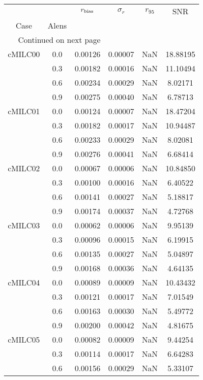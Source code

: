 \begin{longtable}{cccccc}
\toprule
        &     &  $r_{\rm bias}$  &  $\sigma_r$ &  $r_{95}$ &      SNR \\
Case & Alens &                  &             &           &          \\
\midrule
\endhead
\midrule
\multicolumn{3}{r}{{Continued on next page}} \\
\midrule
\endfoot

\bottomrule
\endlastfoot
cMILC00 & 0.0 & 0.00126 & 0.00007 & NaN & 18.88195 \\
        & 0.3 & 0.00182 & 0.00016 & NaN & 11.10494 \\
        & 0.6 & 0.00234 & 0.00029 & NaN & 8.02171 \\
        & 0.9 & 0.00275 & 0.00040 & NaN & 6.78713 \\
cMILC01 & 0.0 & 0.00124 & 0.00007 & NaN & 18.47204 \\
        & 0.3 & 0.00182 & 0.00017 & NaN & 10.94487 \\
        & 0.6 & 0.00233 & 0.00029 & NaN & 8.02081 \\
        & 0.9 & 0.00276 & 0.00041 & NaN & 6.68414 \\
cMILC02 & 0.0 & 0.00067 & 0.00006 & NaN & 10.84850 \\
        & 0.3 & 0.00100 & 0.00016 & NaN & 6.40522 \\
        & 0.6 & 0.00141 & 0.00027 & NaN & 5.18817 \\
        & 0.9 & 0.00174 & 0.00037 & NaN & 4.72768 \\
cMILC03 & 0.0 & 0.00062 & 0.00006 & NaN & 9.95139 \\
        & 0.3 & 0.00096 & 0.00015 & NaN & 6.19915 \\
        & 0.6 & 0.00135 & 0.00027 & NaN & 5.04897 \\
        & 0.9 & 0.00168 & 0.00036 & NaN & 4.64135 \\
cMILC04 & 0.0 & 0.00089 & 0.00009 & NaN & 10.43432 \\
        & 0.3 & 0.00121 & 0.00017 & NaN & 7.01549 \\
        & 0.6 & 0.00163 & 0.00030 & NaN & 5.49772 \\
        & 0.9 & 0.00200 & 0.00042 & NaN & 4.81675 \\
cMILC05 & 0.0 & 0.00082 & 0.00009 & NaN & 9.44254 \\
        & 0.3 & 0.00114 & 0.00017 & NaN & 6.64283 \\
        & 0.6 & 0.00156 & 0.00029 & NaN & 5.33107 \\

\end{longtable}
